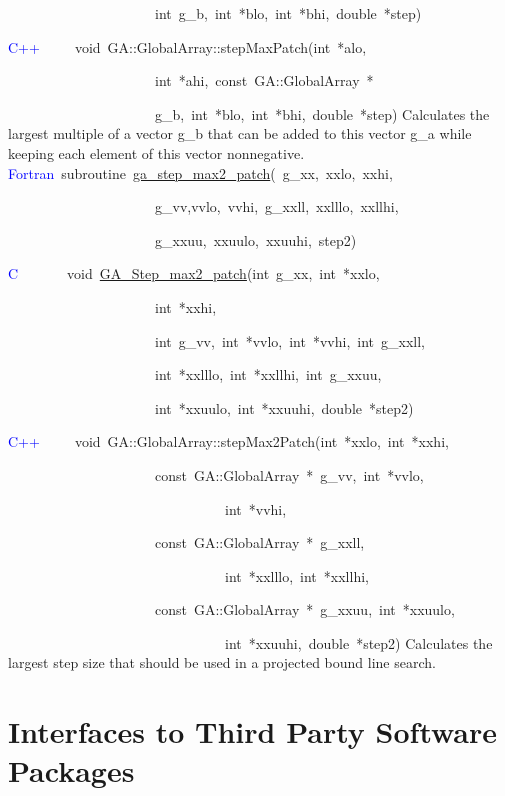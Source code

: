 ~~~~~~~~~~~~~~~~~~~~~int~g\_b,~int~{*}blo,~int~{*}bhi,~double~{*}step)

\textcolor{blue}{C++}~~~~~void~GA::GlobalArray::stepMaxPatch(int~{*}alo,~

~~~~~~~~~~~~~~~~~~~~~int~{*}ahi,~const~GA::GlobalArray~{*}~

~~~~~~~~~~~~~~~~~~~~~g\_b,~int~{*}blo,~int~{*}bhi,~double~{*}step)
Calculates the largest multiple of a vector g\_b that can be added
to this vector g\_a while keeping each element of this vector nonnegative. 
\textcolor{blue}{Fortran}~subroutine~\href{http://www.emsl.pnl.gov/docs/global/ga_ops.html\#ga_step_max2_patch}{ga\_{}step\_{}max2\_{}patch}(~g\_xx,~xxlo,~xxhi,~

~~~~~~~~~~~~~~~~~~~~~g\_vv,vvlo,~vvhi,~g\_xxll,~xxlllo,~xxllhi,~

~~~~~~~~~~~~~~~~~~~~~g\_xxuu,~xxuulo,~xxuuhi,~step2)~

\textcolor{blue}{C}~~~~~~~void~\href{http://www.emsl.pnl.gov/docs/global/c_nga_ops.html\#ga_step_max2_patch}{GA\_{}Step\_{}max2\_{}patch}(int~g\_xx,~int~{*}xxlo,~

~~~~~~~~~~~~~~~~~~~~~int~{*}xxhi,

~~~~~~~~~~~~~~~~~~~~~int~g\_vv,~int~{*}vvlo,~int~{*}vvhi,~int~g\_xxll,~

~~~~~~~~~~~~~~~~~~~~~int~{*}xxlllo,~int~{*}xxllhi,~int~g\_xxuu,~

~~~~~~~~~~~~~~~~~~~~~int~{*}xxuulo,~int~{*}xxuuhi,~double~{*}step2)~

\textcolor{blue}{C++}~~~~~void~GA::GlobalArray::stepMax2Patch(int~{*}xxlo,~int~{*}xxhi,

~~~~~~~~~~~~~~~~~~~~~const~GA::GlobalArray~{*}~g\_vv,~int~{*}vvlo,~

~~~~~~~~~~~~~~~~~~~~~~~~~~~~~~~int~{*}vvhi,~

~~~~~~~~~~~~~~~~~~~~~const~GA::GlobalArray~{*}~g\_xxll,~

~~~~~~~~~~~~~~~~~~~~~~~~~~~~~~~int~{*}xxlllo,~int~{*}xxllhi,~

~~~~~~~~~~~~~~~~~~~~~const~GA::GlobalArray~{*}~g\_xxuu,~int~{*}xxuulo,~

~~~~~~~~~~~~~~~~~~~~~~~~~~~~~~~int~{*}xxuuhi,~double~{*}step2)
Calculates the largest step size that should be used in a projected
bound line search. 


\section{Interfaces to Third Party Software Packages }

